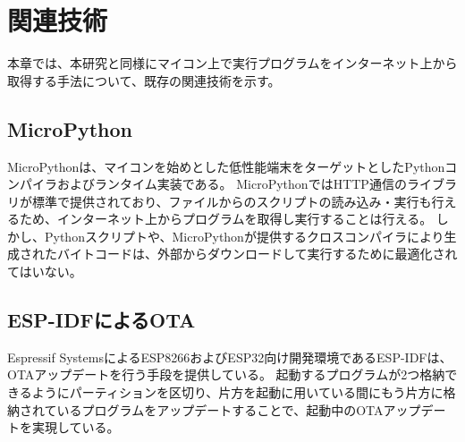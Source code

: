\chapter{関連技術}
\label{chap:related_works}

本章では、本研究と同様にマイコン上で実行プログラムをインターネット上から取得する手法について、既存の関連技術を示す。

\section{MicroPython}

MicroPythonは、マイコンを始めとした低性能端末をターゲットとしたPythonコンパイラおよびランタイム実装である\cite{micropython}。
MicroPythonではHTTP通信のライブラリが標準で提供されており、ファイルからのスクリプトの読み込み・実行も行えるため、インターネット上からプログラムを取得し実行することは行える。
しかし、Pythonスクリプトや、MicroPythonが提供するクロスコンパイラにより生成されたバイトコードは、外部からダウンロードして実行するために最適化されてはいない。

\section{ESP-IDFによるOTA}

Espressif SystemsによるESP8266およびESP32向け開発環境であるESP-IDF\cite{esp_idf}は、OTAアップデートを行う手段を提供している\cite{esp_ota}。
起動するプログラムが2つ格納できるようにパーティションを区切り、片方を起動に用いている間にもう片方に格納されているプログラムをアップデートすることで、起動中のOTAアップデートを実現している。
